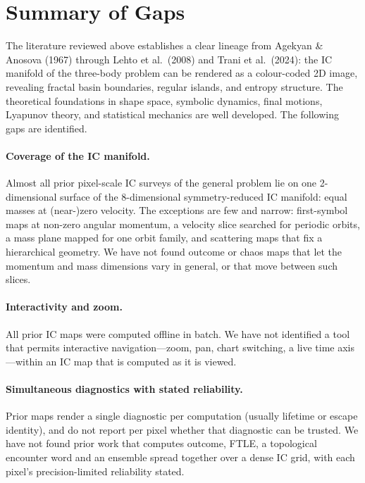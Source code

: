 \documentclass[11pt,a4paper]{article}
\begin{document}
\section{Summary of Gaps}

The literature reviewed above establishes a clear lineage from Agekyan \& Anosova (1967) through
Lehto et al.\ (2008) and Trani et al.\ (2024): the IC manifold of the three-body problem can be
rendered as a colour-coded 2D image, revealing fractal basin boundaries, regular islands, and
entropy structure.  The theoretical foundations in shape space, symbolic dynamics, final motions,
Lyapunov theory, and statistical mechanics are well developed.  The following gaps are identified.

\paragraph{Coverage of the IC manifold.}
Almost all prior pixel-scale IC surveys of the general problem lie on one 2-dimensional surface of
the 8-dimensional symmetry-reduced IC manifold: equal masses at (near-)zero velocity.  The
exceptions are few and narrow: first-symbol maps at non-zero angular momentum, a velocity slice
searched for periodic orbits, a mass plane mapped for one orbit family, and scattering maps that
fix a hierarchical geometry.  We have not found outcome or chaos maps that let the momentum and mass
dimensions vary in general, or that move between such slices.

\paragraph{Interactivity and zoom.}
All prior IC maps were computed offline in batch.  We have not identified a tool that permits
interactive navigation---zoom, pan, chart switching, a live time axis---within an IC map that is
computed as it is viewed.

\paragraph{Simultaneous diagnostics with stated reliability.}
Prior maps render a single diagnostic per computation (usually lifetime or escape identity), and
do not report per pixel whether that diagnostic can be trusted.  We have not found prior work
that computes outcome, FTLE, a topological encounter word and an ensemble spread together over a
dense IC grid, with each pixel's precision-limited reliability stated.
\end{document}
